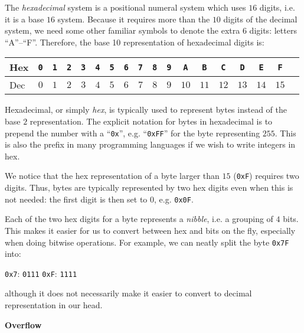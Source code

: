\documentclass[parskip=half]{scrartcl}
\begin{document}
The \emph{hexadecimal} system is a positional numeral system which uses $16$ digits, i.e. it is a base $16$ system.
Because it requires more than the $10$ digits of the decimal system, we need some other familiar symbols to denote the extra $6$ digits: letters \enquote{A}--\enquote{F}.
Therefore, the base 10 representation of hexadecimal digits is:
\begin{center}
\begin{tabular}{|l|c|c|c|c|c|c|c|c|c|c|c|c|c|c|c|c|c|}
  \hline
  Hex &
  \texttt{0} &
  \texttt{1} &
  \texttt{2} &
  \texttt{3} &
  \texttt{4} &
  \texttt{5} &
  \texttt{6} &
  \texttt{7} &
  \texttt{8} &
  \texttt{9} &
  \texttt{A} &
  \texttt{B} &
  \texttt{C} &
  \texttt{D} &
  \texttt{E} &
  \texttt{F}\\
  \hline
  Dec & $0$ & $1$ & $2$ & $3$ & $4$ & $5$ & $6$ & $7$ & $8$ & $9$ & $10$ & $11$ & $12$ & $13$ & $14$ & $15$\\
  \hline
\end{tabular}
\end{center}

Hexadecimal, or simply \emph{hex}, is typically used to represent bytes instead of the base $2$ representation.
The explicit notation for bytes in hexadecimal is to prepend the number with a \enquote{\texttt{0x}}, e.g. \enquote{\texttt{0xFF}} for the byte representing $255$.
This is also the prefix in many programming languages if we wish to write integers in hex.

We notice that the hex representation of a byte larger than $15$ (\texttt{0xF}) requires two digits.
Thus, bytes are typically represented by two hex digits even when this is not needed: the first digit is then set to $0$, e.g. \texttt{0x0F}.

Each of the two hex digits for a byte represents a \emph{nibble}, i.e. a grouping of $4$ bits.
This makes it easier for us to convert between hex and bits on the fly, especially when doing bitwise operations\footnotemark{}.
For example, we can neatly split the byte \texttt{0x7F} into:
\begin{center}
  \texttt{0x7}: \texttt{0111} \hspace*{2cm}
  \texttt{0xF}: \texttt{1111}
\end{center}
although it does not necessarily make it easier to convert to decimal representation in our head.

\textbf{Overflow}
\end{document}
